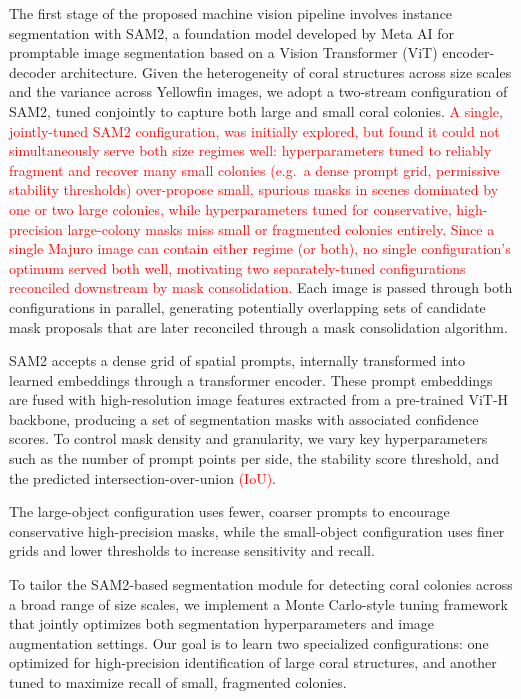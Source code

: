 \documentclass[11pt]{elsarticle}
\newcommand{\revadd}[1]{\textcolor{red}{#1}}
\begin{document}
The first stage of the proposed machine vision pipeline involves instance segmentation with SAM2, a foundation model developed by Meta AI for promptable image segmentation based on a Vision Transformer (ViT) encoder-decoder architecture. Given the heterogeneity of coral structures across size scales and the variance across Yellowfin images, we adopt a two-stream configuration of SAM2, tuned conjointly to capture both large and small coral colonies. \revadd{A single, jointly-tuned SAM2 configuration, was initially explored, but found it could not simultaneously serve both size regimes well: hyperparameters tuned to reliably fragment and recover many small colonies (e.g.\ a dense prompt grid, permissive stability thresholds) over-propose small, spurious masks in scenes dominated by one or two large colonies, while hyperparameters tuned for conservative, high-precision large-colony masks miss small or fragmented colonies entirely. Since a single Majuro image can contain either regime (or both), no single configuration's optimum served both well, motivating two separately-tuned configurations reconciled downstream by mask consolidation.} Each image is passed through both configurations in parallel, generating potentially overlapping sets of candidate mask proposals that are later reconciled through a mask consolidation algorithm.

SAM2 accepts a dense grid of spatial prompts, internally transformed into learned embeddings through a transformer encoder. These prompt embeddings are fused with high-resolution image features extracted from a pre-trained ViT-H backbone, producing a set of segmentation masks with associated confidence scores. To control mask density and granularity, we vary key hyperparameters such as the number of prompt points per side, the stability score threshold, and the predicted intersection-over-union \revadd{(IoU)}.

The large-object configuration uses fewer, coarser prompts to encourage conservative high-precision masks, while the small-object configuration uses finer grids and lower thresholds to increase sensitivity and recall.

To tailor the SAM2-based segmentation module for detecting coral colonies across a broad range of size scales, we implement a Monte Carlo-style tuning framework that jointly optimizes both segmentation hyperparameters and image augmentation settings. Our goal is to learn two specialized configurations: one optimized for high-precision identification of large coral structures, and another tuned to maximize recall of small, fragmented colonies.
\end{document}
